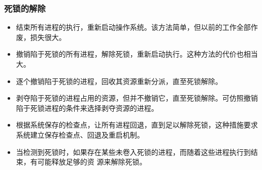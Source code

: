 \documentclass[cs4size,a4paper,10pt]{ctexart}
\begin{document}
	\subsubsection{死锁的解除}
	\begin{itemize}
		\item 结束所有进程的执行，重新启动操作系统。该方法简单，但以前的工作全部作废，损失很大。
		\item 撤销陷于死锁的所有进程，解除死锁，重新启动执行。这种方法的代价也相当大。
		\item 逐个撤销陷于死锁的进程，回收其资源重新分派，直至死锁解除。
		\item 剥夺陷于死锁的进程占用的资源，但并不撤销它，直至死锁解除。可仿照撤销陷于死锁进程的条件来选择剥夺资源的进程。
		\item 根据系统保存的检查点，让所有进程回退，直到足以解除死锁，这种措施要求系统建立保存检查点、回退及重启机制。
		\item 当检测到死锁时，如果存在某些未卷入死锁的进程，而随着这些进程执行到结束，有可能释放足够的资 源来解除死锁。
	\end{itemize}




	
\end{document}
